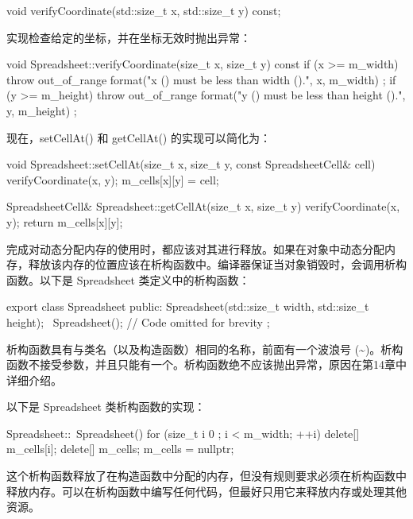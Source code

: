 \begin{cpp}
void verifyCoordinate(std::size_t x, std::size_t y) const;
\end{cpp}

实现检查给定的坐标，并在坐标无效时抛出异常：

\begin{cpp}
void Spreadsheet::verifyCoordinate(size_t x, size_t y) const
{
    if (x >= m_width) {
        throw out_of_range {
            format("x ({}) must be less than width ({}).", x, m_width) };
    }
    if (y >= m_height) {
        throw out_of_range {
            format("y ({}) must be less than height ({}).", y, m_height) };
    }
}
\end{cpp}

现在，setCellAt() 和 getCellAt() 的实现可以简化为：

\begin{cpp}
void Spreadsheet::setCellAt(size_t x, size_t y, const SpreadsheetCell& cell)
{
    verifyCoordinate(x, y);
    m_cells[x][y] = cell;
}

SpreadsheetCell& Spreadsheet::getCellAt(size_t x, size_t y)
{
    verifyCoordinate(x, y);
    return m_cells[x][y];
}
\end{cpp}


完成对动态分配内存的使用时，都应该对其进行释放。如果在对象中动态分配内存，释放该内存的位置应该在析构函数中。编译器保证当对象销毁时，会调用析构函数。以下是 Spreadsheet 类定义中的析构函数：

\begin{cpp}
export class Spreadsheet
{
    public:
        Spreadsheet(std::size_t width, std::size_t height);
        ~Spreadsheet();
        // Code omitted for brevity
};
\end{cpp}

析构函数具有与类名（以及构造函数）相同的名称，前面有一个波浪号 (\textasciitilde)。析构函数不接受参数，并且只能有一个。析构函数绝不应该抛出异常，原因在第14章中详细介绍。

以下是 Spreadsheet 类析构函数的实现：

\begin{cpp}
Spreadsheet::~Spreadsheet()
{
    for (size_t i { 0 }; i < m_width; ++i) {
        delete[] m_cells[i];
    }
    delete[] m_cells;
    m_cells = nullptr;
}
\end{cpp}

这个析构函数释放了在构造函数中分配的内存，但没有规则要求必须在析构函数中释放内存。可以在析构函数中编写任何代码，但最好只用它来释放内存或处理其他资源。

